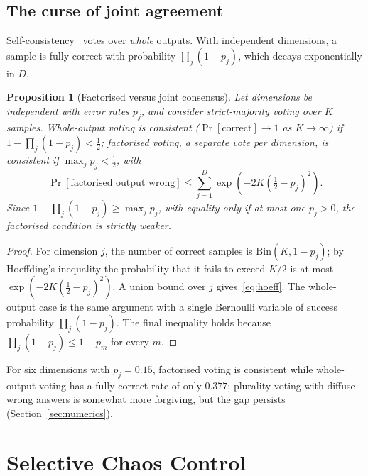 \documentclass[preprint,12pt]{elsarticle}
\newtheorem{proposition}{Proposition}
\begin{document}
\subsection{The curse of joint agreement}
Self-consistency~\cite{wang2023sc} votes over \emph{whole} outputs. With independent dimensions, a sample is fully correct with probability $\prod_j(1-p_j)$, which decays exponentially in $D$.

\begin{proposition}[Factorised versus joint consensus]
\label{prop:joint}
Let dimensions be independent with error rates $p_j$, and consider strict-majority voting over $K$ samples. Whole-output voting is consistent ($\Pr[\text{correct}]\to1$ as $K\to\infty$) if $1-\prod_j(1-p_j)<\tfrac12$; factorised voting, a separate vote per dimension, is consistent if $\max_j p_j<\tfrac12$, with
\begin{equation}
\Pr[\text{factorised output wrong}]\le\sum_{j=1}^{D}\exp\!\left(-2K\left(\tfrac12-p_j\right)^2\right).
\label{eq:hoeff}
\end{equation}
Since $1-\prod_j(1-p_j)\ge\max_j p_j$, with equality only if at most one $p_j>0$, the factorised condition is strictly weaker.
\end{proposition}
\begin{proof}
For dimension $j$, the number of correct samples is $\mathrm{Bin}(K,1-p_j)$; by Hoeffding's inequality the probability that it fails to exceed $K/2$ is at most $\exp(-2K(\frac12-p_j)^2)$. A union bound over $j$ gives~\eqref{eq:hoeff}. The whole-output case is the same argument with a single Bernoulli variable of success probability $\prod_j(1-p_j)$. The final inequality holds because $\prod_j(1-p_j)\le 1-p_m$ for every $m$.
\end{proof}
For six dimensions with $p_j=0.15$, factorised voting is consistent while whole-output voting has a fully-correct rate of only $0.377$; plurality voting with diffuse wrong answers is somewhat more forgiving, but the gap persists (Section~\ref{sec:numerics}).

\section{Selective Chaos Control}
\label{sec:scc}
\end{document}
